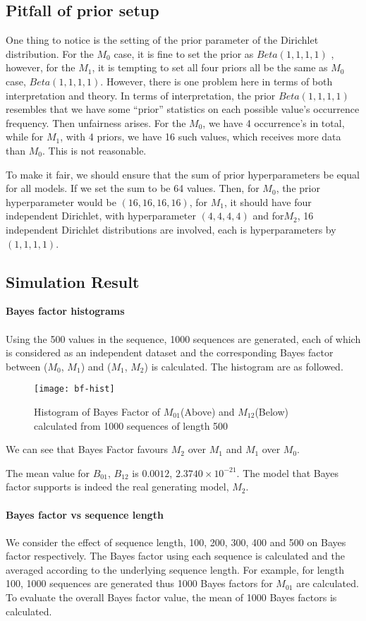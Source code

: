 \documentclass[paper=a4, fontsize=11pt]{scrartcl} %
\numberwithin{equation}{section} %
\numberwithin{figure}{section} %
\numberwithin{table}{section} %
\begin{document}
\subsection {Pitfall of prior setup}
One thing to notice is the setting of the  prior parameter of the Dirichlet distribution. For the $M_0$ case, it is fine to set the prior as $Beta (1, 1, 1, 1)$ , however, for the $M_1$, it is tempting to set all four priors all be the same as $M_0$ case, $Beta (1, 1, 1, 1)$. However, there is one problem here in terms of both interpretation and theory. In terms of interpretation, the prior $Beta (1,1,1,1)$  resembles that we have some ``prior'' statistics on each possible value's occurrence frequency. Then unfairness arises. For the $M_0$, we have 4 occurrence's in total, while for $M_1$, with 4 priors, we have 16 such values, which receives more data than $M_0$. This is not reasonable. 

To make it fair, we should ensure that the sum of prior hyperparameters be equal for all models. If we set the sum to be 64 values. Then, for $M_0$, the prior hyperparameter would be $(16, 16, 16, 16)$, for $M_1$, it should have four independent Dirichlet, with hyperparameter $(4,4,4,4)$ and for$M_2$, 16 independent Dirichlet distributions are involved, each is hyperparameters by $(1,1,1,1)$.

\subsection {Simulation Result}

{\bf Bayes factor histograms}
\\\\
Using the 500 values in the sequence, 1000 sequences are generated, each of which is considered as an independent dataset and the corresponding  Bayes factor between ($M_0$, $M_1$) and ($M_1$, $M_2$) is calculated. The histogram are as followed. 
 
\begin{figure}[H]
  \centering
  \texttt{[image: bf-hist]}
  \caption{Histogram of Bayes Factor of $M_{01}$(Above) and $M_{12}$(Below) calculated from 1000 sequences of length 500}
\end{figure}
  
We can see that Bayes Factor favours $M_2$ over $M_1$ and $M_1$ over $M_0$.

The mean value for $B_{01}$, $B_{12}$ is $0.0012$, $2.3740 \times 10^{-21}$. The model that Bayes factor supports is indeed the real generating model, $M_2$.
\\\\
{\bf Bayes factor vs sequence length}
\\\\
We consider the effect of sequence length, 100, 200, 300, 400 and 500 on Bayes factor respectively. The Bayes factor using each sequence is calculated and the averaged according to the underlying sequence length. For example, for length 100, 1000 sequences are generated thus 1000 Bayes factors for $M_{01}$ are calculated. To evaluate the overall Bayes factor value, the mean of 1000 Bayes factors is calculated.
\end{document}

